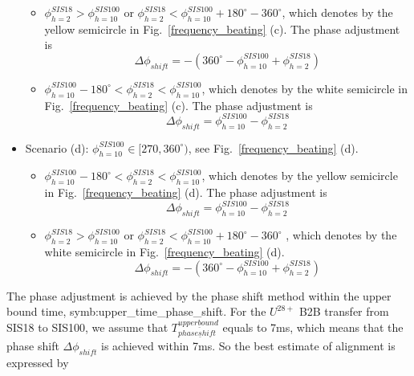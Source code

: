 \begin{itemize}
	\begin{itemize}
		\item $\phi_{h=2}^{SIS18} > \phi_{h=10}^{SIS100}$ or  $\phi_{h=2}^{SIS18} < \phi_{h=10}^{SIS100} +180^\circ - 360^\circ $, which denotes by the yellow semicircle in Fig.~\ref{frequency_beating} (c). The phase adjustment is
    \begin{equation}			
\Delta \phi_{shift}=-(360^\circ - \phi_{h=10}^{SIS100}+ \phi_{h=2}^{SIS18})
    \end{equation}
    		\item $\phi_{h=10}^{SIS100}-180^\circ < \phi_{h=2}^{SIS18}< \phi_{h=10}^{SIS100}$, which denotes by the white semicircle in Fig.~\ref{frequency_beating} (c). The phase adjustment is
    \begin{equation}			
\Delta \phi_{shift}=\phi_{h=10}^{SIS100}-\phi_{h=2}^{SIS18}
    \end{equation}
	\end{itemize}
    \item Scenario (d): $\phi_{h=10}^{SIS100}\in [270,360^\circ)$, see Fig.~\ref{frequency_beating} (d).

	\begin{itemize}
		\item $\phi_{h=10}^{SIS100}-180^\circ < \phi_{h=2}^{SIS18}< \phi_{h=10}^{SIS100}$, which denotes by the yellow semicircle in Fig.~\ref{frequency_beating} (d). The phase adjustment is 
	    \begin{equation}	
\Delta \phi_{shift}=\phi_{h=10}^{SIS100}-\phi_{h=2}^{SIS18}	
    \end{equation}
    		\item $\phi_{h=2}^{SIS18} > \phi_{h=10}^{SIS100}$ or  $\phi_{h=2}^{SIS18} < \phi_{h=10}^{SIS100} +180^\circ - 360^\circ $ , which denotes by the white semicircle in Fig.~\ref{frequency_beating} (d). 
    \begin{equation}			
\Delta \phi_{shift}=-(360^\circ - \phi_{h=10}^{SIS100}+ \phi_{h=2}^{SIS18})
    \end{equation}
	\end{itemize}
\end{itemize}

The phase adjustment is achieved by the phase shift method within the upper bound time, \gls{symb:upper_time_phase_shift}. For the $U^{28+}$ B2B transfer from SIS18 to SIS100, we assume that $T_{phase\underline shift}^{upper\underline bound}$ equals to 7ms, which means that the phase shift $\Delta \phi_{shift}$ is achieved within 7ms. So the best estimate of alignment is expressed by 

